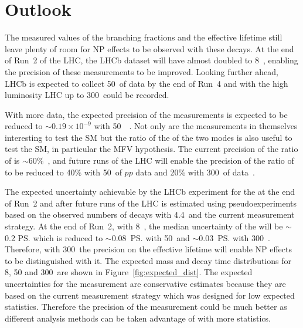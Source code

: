 \section{Outlook}
The measured values of the branching fractions and the effective lifetime still leave plenty of room for NP effects to be observed with these decays. At the end of Run~2 of the LHC, the LHCb dataset will have almost doubled to 8~\fb, enabling the precision of these measurements to be improved. Looking further ahead, LHCb is expected to collect 50~\fb of data by the end of Run~4 and with the high luminosity LHC up to 300~\fb could be recorded. 

With more data, the expected precision of the \BF measurements is expected to be reduced to $\sim 0.19 \times 10^{-9}$ with 50~\fb~\cite{LHCb-PUB-2014-040}. Not only are the \BF measurements in themselves interesting to test the SM but the ratio of the \BFs of the two modes is also useful to test the SM, in particular the MFV hypothesis. The current precision of the ratio of \BFs is $\sim 60\%$~\cite{CMS:2014xfa}, and future runs of the LHC will enable the precision of the ratio of \BFs to be reduced to 40$\%$ with 50~\fb of $pp$ data and 20$\%$ with 300~\fb of data~\cite{Aaij:2244311}. 

The expected uncertainty achievable by the LHCb experiment for the \el at the end of Run~2 and after future runs of the LHC is estimated using pseudoexperiments based on the observed numbers of decays with 4.4~\fb and the current measurement strategy. At the end of Run~2, with 8~\fb, the median uncertainty of the \el will be $\sim$0.2 \ps which is reduced to $\sim$0.08~\ps with 50~\fb and $\sim$0.03~\ps with 300~\fb. Therefore, with 300~\fb the precision on the effective lifetime will enable NP effects to be distinguished with it. The expected mass and decay time distributions for 8, 50 and 300~\fb are shown in Figure~\ref{fig:expected_dist}. The expected uncertainties for the \el measurement are conservative estimates because they are based on the current measurement strategy which was designed for low expected statistics. Therefore the precision of the measurement could be much better as different analysis methods can be taken advantage of with more statistics. 


